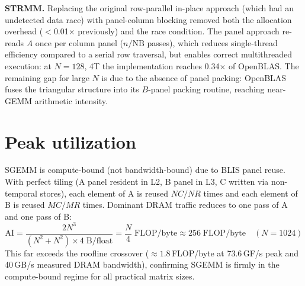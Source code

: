 \documentclass[11pt,a4paper]{article}
\begin{document}
\textbf{STRMM.}
Replacing the original row-parallel in-place approach (which had an undetected data race) with
panel-column blocking removed both the allocation overhead ($<$0.01$\times$ previously) and the
race condition.  The panel approach re-reads $A$ once per column panel ($n/\text{NB}$ passes),
which reduces single-thread efficiency compared to a serial row traversal, but enables correct
multithreaded execution: at $N=128$, 4T the implementation reaches 0.34$\times$ of OpenBLAS.
The remaining gap for large $N$ is due to the absence of panel packing: OpenBLAS fuses the
triangular structure into its $B$-panel packing routine, reaching near-GEMM arithmetic intensity.

\section{Peak utilization}

SGEMM is compute-bound (not bandwidth-bound) due to BLIS panel reuse. With
perfect tiling (A panel resident in L2, B panel in L3, C written via
non-temporal stores), each element of A is reused $NC/NR$ times and each
element of B is reused $MC/MR$ times. Dominant DRAM traffic reduces to one
pass of A and one pass of B:
\begin{equation}
  \mathrm{AI} = \frac{2N^3}{(N^2 + N^2)\times 4\;\mathrm{B/float}}
              = \frac{N}{4}\;\mathrm{FLOP/byte}
              \approx 256\;\mathrm{FLOP/byte} \quad (N{=}1024)
  \label{eq:sgemm_ai}
\end{equation}
This far exceeds the roofline crossover ($\approx 1.8$\,FLOP/byte at
73.6\,GF/s peak and 40\,GB/s measured DRAM bandwidth), confirming SGEMM is firmly in the
compute-bound regime for all practical matrix sizes.
\end{document}
